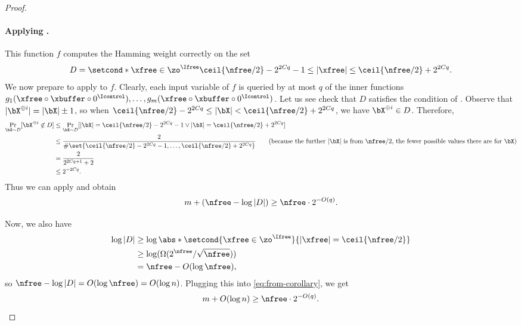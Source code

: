 \begin{proof}
\paragraph*{Applying .}
This function $f$ computes the Hamming weight correctly on the set
\[
D = \setcond*{\xfree \in \zo^{\Ifree}}{\ceil{\nfree/2}-2^{2Cq}-1 \leq |\xfree| \leq \ceil{\nfree/2} + 2^{2Cq}}.
\]
We now prepare to apply  to $f$.
Clearly, each input variable of $f$ is queried by at most $q$
of the inner functions $g_1(\xfree \circ \xbuffer \circ 0^{\Icontrol}), \ldots, g_m(\xfree \circ \xbuffer \circ 0^{\Icontrol})$.
Let us see check that $D$ satisfies the condition of .
Observe that $|\bX^{\oplus i}| = |\bX|\pm 1$, so when $\ceil{\nfree/2}-2^{2Cq} \leq |\bX| < \ceil{\nfree/2}+2^{2Cq}$, we have $\bX^{\oplus i} \in D$. Therefore,
\begin{align*}
    \Pr_{\bX \sim D}[\bX^{\oplus i} \not\in D]
    &\leq \Pr_{\bX \sim D}[|\bX| = \ceil{\nfree/2} - 2^{2Cq} - 1 \vee |\bX| = \ceil{\nfree/2} + 2^{2Cq}]\\%
    &\leq \frac{2}{\#%
    \set{\ceil{\nfree/2}-2^{2Cq}-1, \ldots, \ceil{\nfree/2} + 2^{2Cq}}}\tag{because the further $|\bX|$ is from $\nfree/2$, the fewer possible values there are for $\bX$}\\
    &= \frac{2}{2^{2Cq+1}+2}\\
    &\leq 2^{-2Cq}.
\end{align*}
Thus we can apply  and obtain
\begin{equation}
    \label{eq:from-corollary}
    m + (\nfree - \log |D|) \geq \nfree \cdot 2^{-O(q)}.
\end{equation}

Now, we also have
\begin{align*}
    \log|D|
    &\geq \log\abs*{\setcond{\xfree \in \zo^{\Ifree}}{|\xfree| = \ceil{\nfree/2}}}\nonumber\\
    &\geq \log(\Omega(2^{\nfree}/\sqrt{\nfree}))\nonumber\\
    &= \nfree - O(\log \nfree),
\end{align*}
so $\nfree - \log |D| = O(\log \nfree) = O(\log n)$.
Plugging this into \eqref{eq:from-corollary}, we get
\begin{equation}
    \label{eq:before-asymptotics}
    m + O(\log n) \geq \nfree \cdot 2^{-O(q)}.
\end{equation}


\end{proof}
